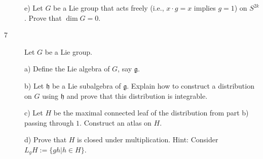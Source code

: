 \documentclass[12pt]{article}
\begin{document}
\begin{large}
\begin{description}
\item[\quad] e)
Let $G$ be a Lie group that acts freely (i.e., $x\cdot g=x$ implies $g=1$)
on $S^{2k}$. Prove that $\dim G=0$.


\item[7]
Let $G$ be a Lie group.



\item[\quad] a)
Define the Lie algebra of $G$, say $\mathfrak g$.

\item[\quad] b)
Let $\mathfrak h$ be a Lie subalgebra of $\mathfrak g$.
Explain how to construct a distribution on $G$ using $\mathfrak h$ and prove
that this distribution is integrable.

\item[\quad] c)
Let $H$ be the maximal connected leaf of the distribution from part b)
passing through $1$.
Construct an atlas on $H$.

\item[\quad] d)
Prove that $H$ is closed under multiplication.
\newline
Hint: Consider $L_gH:=\{gh|h\in H\}$.






\end{description}
\end{large}
\end{document}
